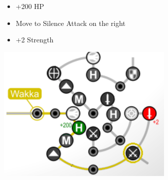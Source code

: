 \begin{spheregrid}
\begin{itemize}
\begin{itemize}
		\item +200 HP
		\item Move to Silence Attack on the right
		\item +2 Strength
	\end{itemize}
	\includegraphics{graphics/wakkammr}
	\end{itemize}
\end{spheregrid}

